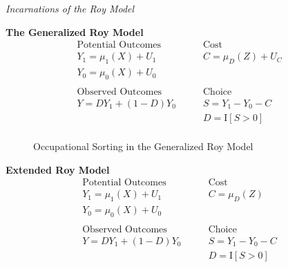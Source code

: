 \begin{frame}\begin{center}
		\LARGE\textit{Incarnations of the Roy Model}
\end{center}\end{frame}
\begin{frame}
	\textbf{The Generalized Roy Model}
	\begin{align*}
	\text{Potential Outcomes} &\qquad \text{Cost} \\
	Y_1 = \mu_1(X) + U_1      &\qquad C = \mu_D(Z) + U_C \\
	Y_0 = \mu_0(X) + U_0      &\qquad \\
	& \\
	\text{Observed Outcomes } &\qquad \text{Choice} \\
	Y = D Y_1 + (1 - D)Y_0 &\qquad S = Y_1 - Y_0 - C \\
	&\qquad D = \mathrm{I}[S > 0] \\
	\end{align*}
\end{frame}
\begin{frame}
	\begin{figure}[htp]\centering
		\caption{Occupational Sorting in the Generalized Roy Model}\label{Occupational Sorting in the Generalized Roy Model}
	\end{figure}
\end{frame}
\begin{frame}
	\textbf{Extended Roy Model}	
	\begin{align*}
	\text{Potential Outcomes} &\qquad \text{Cost} \\
	Y_1 = \mu_1(X) + U_1      &\qquad C = \mu_D(Z) \\
	Y_0 = \mu_0(X) + U_0      &\qquad \\
	& \\
	\text{Observed Outcomes } &\qquad \text{Choice} \\
	Y = D Y_1 + (1 - D)Y_0 &\qquad S = Y_1 - Y_0 - C \\
	&\qquad D = \mathrm{I}[S > 0] \\
	\end{align*}	
\end{frame}
